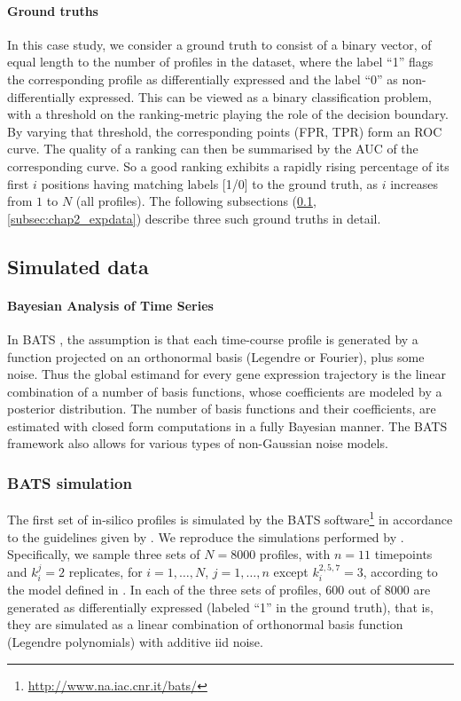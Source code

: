       \paragraph{Ground truths} In this case study, we consider a ground truth to consist of a binary vector,
      of equal length to the number of profiles in the dataset, where the
      label ``1'' flags the corresponding profile as differentially
      expressed and the label ``0'' as non-differentially expressed. This can be viewed as a
      binary classification problem, with a threshold on the ranking-metric
      playing the role of the decision boundary. By varying that threshold, the
      corresponding points (FPR, TPR) form an ROC curve. The quality of a
      ranking can then be summarised by the AUC of the corresponding curve.
      So a good ranking exhibits a rapidly rising percentage
      of its first $i$ positions having matching labels [1/0] to the ground truth,
      as $i$ increases from $1$ to $N$ (all profiles). The following subsections
      (\ref{subsec:chap2_simdata}, \ref{subsec:chap2_expdata}) describe three such
      ground truths in detail.

    \subsection{Simulated data} \label{subsec:chap2_simdata}
      \paragraph{Bayesian Analysis of Time Series}  In BATS \citep{angelini2007bayesian}, the assumption is
      that each time-course profile is generated by a function projected on an orthonormal basis (Legendre or Fourier),
      plus some noise. Thus the global estimand for every gene expression
      trajectory is the linear combination of a number of basis functions, whose
      coefficients are modeled by a posterior distribution. The number of basis
      functions and their coefficients, are estimated with closed form
      computations in a fully Bayesian manner. The BATS framework also
      allows for various types of non-Gaussian noise models.

      \subsubsection{BATS simulation}
	The first set of in-silico profiles is simulated by the BATS
	software\footnote{\url{http://www.na.iac.cnr.it/bats/}} in accordance to the
	guidelines given by \citet{angelini2008bats}.
	We reproduce the simulations performed by
	\citet{angelini2007bayesian}. Specifically, we sample three sets of $N=8000$ profiles,
	with $n=11$ timepoints and $k_i^j=2$ replicates, for $i=1,\ldots,N$,
	$j=1,\ldots,n$ except $k_i^{2,5,7}=3$, according to the model defined in
	\citep[sec. 2.2]{angelini2007bayesian}. In each of the three sets of
	profiles, 600 out of 8000 are generated as differentially expressed
	(labeled ``1'' in the ground truth), that is, they are simulated as a
	linear combination of orthonormal basis function (Legendre polynomials)
	with additive iid noise.

